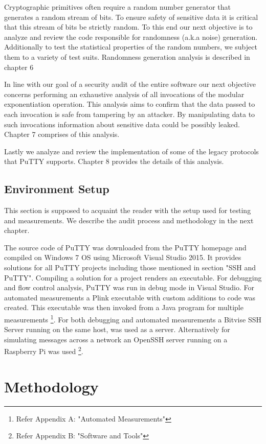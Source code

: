 \documentclass{report}
\begin{document}
Cryptographic primitives often require a random number generator that generates a random stream of bits. To ensure safety of sensitive data it is critical that this stream of bits be strictly random. To this end our next objective is to analyze and review the code responsible for randomness (a.k.a noise) generation. Additionally to test the statistical properties of the random numbers, we subject them to a variety of test suits. Randomness generation analysis is described in chapter 6\par
In line with our goal of a security audit of the entire software our next objective concerns performing an exhaustive analysis of all invocations of the modular exponentiation operation. This analysis aims to confirm that the data passed to each invocation is safe from tampering by an attacker. By manipulating data to such invocations information about sensitive data could be possibly leaked. Chapter 7 comprises of this analysis.\par
Lastly we analyze and review the implementation of some of the legacy protocols that PuTTY supports. Chapter 8 provides the details of this analysis.\par
\section{Environment Setup}
This section is supposed to acquaint the reader with the setup used for testing and measurements. We describe the audit process and methodology in the next chapter.\par

The source code of PuTTY was downloaded from the PuTTY homepage \cite{putty} and compiled on Windows 7 OS using Microsoft Visual Studio 2015. It provides solutions for all PuTTY projects including those mentioned in section "SSH and PuTTY". Compiling a solution for a project renders an executable. For debugging and flow control analysis, PuTTY was run in debug mode in Visual Studio. For automated measurements a Plink executable with custom additions to code was created. This executable was then invoked from a Java program for multiple measurements \footnote{Refer Appendix A: "Automated Measurements"}. For both debugging and automated measurements a Bitvise SSH Server running on the same host, was used as a server. Alternatively for simulating messages across a network an OpenSSH server running on a Raspberry Pi was used \footnote{Refer Appendix B: "Software and Tools"}.
\chapter{Methodology}
\end{document}
